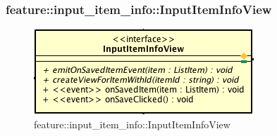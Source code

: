\subsubsection{feature::input\_item\_info::InputItemInfoView}

\label{feature::input\_item\_info::InputItemInfoView}
\begin{figure}[ht]
	\centering
	\includegraphics[scale=0.5]{Sezioni/SottosezioniST/img/app/InputItemInfoView.png}
	\caption{feature::input\_item\_info::InputItemInfoView}
\end{figure}

